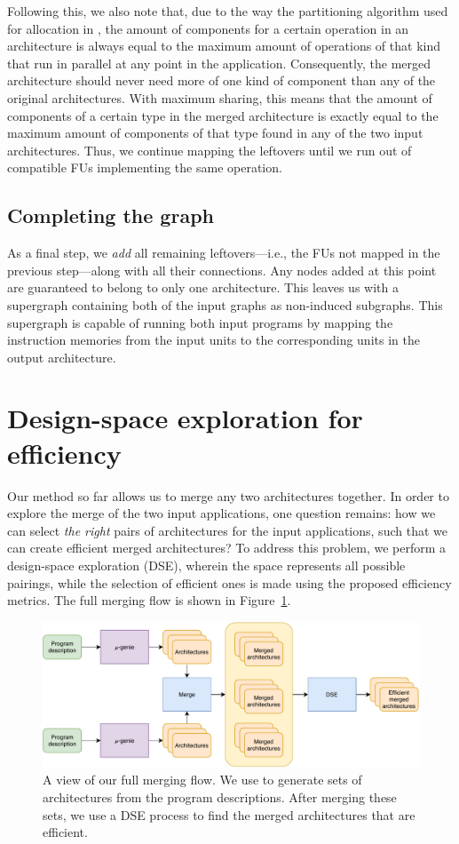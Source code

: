 Following this, we also note that, due to the way the partitioning algorithm used for allocation in \microgenie, the amount of components for a certain operation in an architecture is always equal to the maximum amount of operations of that kind that run in parallel at any point in the application. Consequently, the merged architecture should never need more of one kind of component than any of the original architectures. With maximum sharing, this means that the amount of components of a certain type in the merged architecture is exactly equal to the maximum amount of components of that type found in any of the two input architectures. Thus, we continue mapping the leftovers until we run out of compatible FUs implementing the same operation.

\subsection{Completing the graph}
As a final step, we \textit{add} all remaining leftovers---i.e., the FUs not mapped in the previous step---along with all their connections. Any nodes added at this point are guaranteed to belong to only one architecture. This leaves us with a supergraph containing both of the input graphs as non-induced subgraphs. This supergraph is capable of running both input programs by mapping the instruction memories from the input units to the corresponding units in the output architecture.

\section{Design-space exploration for efficiency}
\label{method:dse}
Our method so far allows us to merge any two architectures together. In order to explore the merge of the two input applications, one question remains: how we can select \textit{the right} pairs of architectures for the input applications, such that we can create efficient merged architectures? To address this problem, we perform a design-space exploration (DSE), wherein the space represents all possible pairings, while the selection of efficient ones is made using the proposed efficiency metrics. The full merging flow is shown in Figure~\ref{fig:full_flow}.

\begin{figure}[!htb]
    \centering
    \includegraphics[width=\textwidth]{graphs/full_flow.pdf}
    \caption{A view of our full merging flow. We use \microgenie to generate sets of architectures from the program descriptions. After merging these sets, we use a DSE process to find the merged architectures that are efficient.}
    \label{fig:full_flow}
\end{figure}

